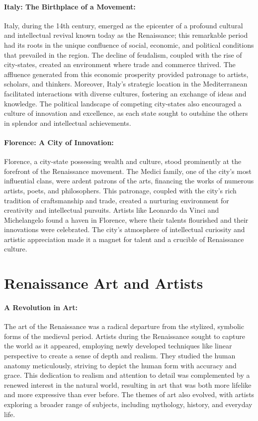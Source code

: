\documentclass[a4paper,12pt]{book}
\begin{document}
\paragraph{Italy: The Birthplace of a Movement:}
Italy, during the 14th century, emerged as the epicenter of a profound cultural and intellectual revival known today as the Renaissance; this remarkable period had its roots in the unique confluence of social, economic, and political conditions that prevailed in the region. The decline of feudalism, coupled with the rise of city-states, created an environment where trade and commerce thrived. The affluence generated from this economic prosperity provided patronage to artists, scholars, and thinkers. Moreover, Italy's strategic location in the Mediterranean facilitated interactions with diverse cultures, fostering an exchange of ideas and knowledge. The political landscape of competing city-states also encouraged a culture of innovation and excellence, as each state sought to outshine the others in splendor and intellectual achievements.

\paragraph{Florence: A City of Innovation:}
Florence, a city-state possessing wealth and culture, stood prominently at the forefront of the Renaissance movement. The Medici family, one of the city’s most influential clans, were ardent patrons of the arts, financing the works of numerous artists, poets, and philosophers. This patronage, coupled with the city’s rich tradition of craftsmanship and trade, created a nurturing environment for creativity and intellectual pursuits. Artists like Leonardo da Vinci and Michelangelo found a haven in Florence, where their talents flourished and their innovations were celebrated. The city’s atmosphere of intellectual curiosity and artistic appreciation made it a magnet for talent and a crucible of Renaissance culture.

\section*{Renaissance Art and Artists}

\paragraph{A Revolution in Art:}
The art of the Renaissance was a radical departure from the stylized, symbolic forms of the medieval period. Artists during the Renaissance sought to capture the world as it appeared, employing newly developed techniques like linear perspective to create a sense of depth and realism. They studied the human anatomy meticulously, striving to depict the human form with accuracy and grace. This dedication to realism and attention to detail was complemented by a renewed interest in the natural world, resulting in art that was both more lifelike and more expressive than ever before. The themes of art also evolved, with artists exploring a broader range of subjects, including mythology, history, and everyday life.
\end{document}
